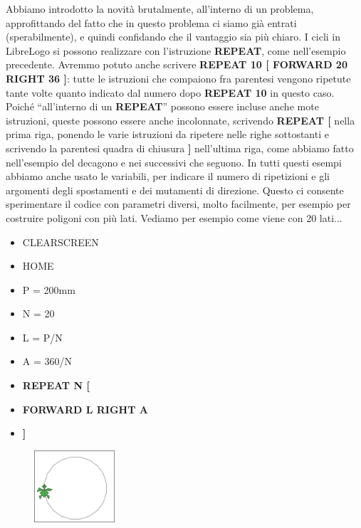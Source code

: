 Abbiamo introdotto la novità brutalmente, all'interno di un problema, approfittando del fatto che in questo problema ci siamo già entrati (sperabilmente), e quindi confidando che il vantaggio sia più chiaro. I cicli in LibreLogo si possono realizzare con l'istruzione \textbf{REPEAT}, come nell'esempio precedente. Avremmo potuto anche scrivere \textbf{REPEAT 10 [ FORWARD 20 RIGHT 36 ]}: tutte le istruzioni che compaiono fra parentesi vengono ripetute tante volte quanto indicato dal numero dopo \textbf{REPEAT 10} in questo caso. Poiché “all'interno di un \textbf{REPEAT}” possono essere incluse anche mote istruzioni, queste possono essere anche incolonnate, scrivendo \textbf{REPEAT [} nella prima riga, ponendo le varie istruzioni da ripetere nelle righe sottostanti e scrivendo la parentesi quadra di chiusura \textbf{]} nell'ultima riga, come abbiamo fatto nell'esempio del decagono e nei successivi che seguono. In tutti questi esempi abbiamo anche usato le variabili, per indicare il numero di ripetizioni e gli argomenti degli spostamenti e dei mutamenti di direzione. Questo ci consente sperimentare il codice con parametri diversi, molto facilmente, per esempio per costruire poligoni con più lati. Vediamo per esempio come viene con 20 lati...

\begin{scriptsize}
\begin{minipage}{0.40\textwidth}
\begin{itemize}[itemsep=-3pt,parsep=2pt]
\item[] CLEARSCREEN                 
\item[] HOME
\item[] P = 200mm
\item[] N = 20
\item[] L = P/N
\item[] A = 360/N
\item[] \textbf{REPEAT N [}
\item[]  \hspace{0.5cm}	\textbf{FORWARD L RIGHT A}
\item[] \textbf{]}                           
\end{itemize}
\end{minipage}
\end{scriptsize}
\begin{minipage}{0.4\textwidth}
\begin{figure}[H]
   \includegraphics[width=3.0cm,trim=4 4 8 4,clip]{./images/ripetere/ripetere-5.png}
   \label{rip-5}
\end{figure}
\end{minipage} \hfill

